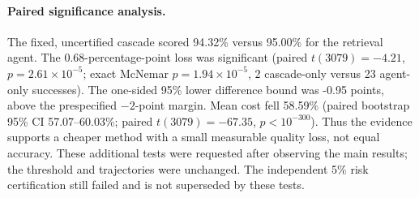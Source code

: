 \paragraph{Paired significance analysis.}
The fixed, uncertified cascade scored 94.32\% versus
95.00\% for the retrieval agent.
The 0.68-percentage-point loss was significant
(paired $t(3079)=-4.21$,
$p=2.61\times 10^{-5}$; exact McNemar $p=1.94\times 10^{-5}$,
2 cascade-only versus 23 agent-only successes).
The one-sided 95\% lower difference bound was
-0.95 points, above the prespecified $-2$-point margin.
Mean cost fell 58.59\%
(paired bootstrap 95\% CI 57.07--60.03\%;
paired $t(3079)=-67.35$, $p<10^{-300}$).
Thus the evidence supports a cheaper method with a small measurable quality loss,
not equal accuracy. These additional tests were requested after observing the main
results; the threshold and trajectories were unchanged. The independent 5\% risk
certification still failed and is not superseded by these tests.
